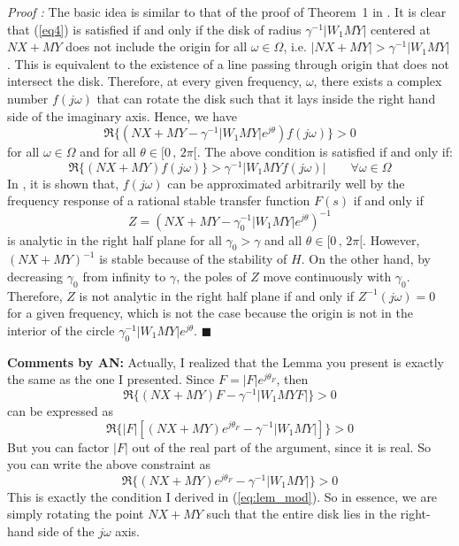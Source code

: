 \documentclass[12pt]{article}
\begin{document}
{\it Proof :} 
The basic idea is similar to that of  the proof of Theorem~1 in \cite{RM94}. It is clear that (\ref{eq4}) is satisfied if and only if the disk of radius $ \gamma ^{-1}|W_1MY|$ centered at $NX+MY$ does not include the origin for all $\omega \in \Omega$, i.e. $|NX+MY|>\gamma ^{-1}|W_1MY|$. This is equivalent to the existence of a line passing through origin that does not intersect the disk. Therefore, at every given frequency, $\omega$, there exists a complex number $f(j\omega)$ that can rotate the disk such that it lays inside the right hand side of the imaginary axis. Hence, we have 
\begin{equation}
\label{eq18}
\Re\{ (NX + MY - \gamma ^{-1}|W_1MY|e^{j\theta})f(j\omega)\}>0
\end{equation}
for all $\omega \in \Omega$ and for all $\theta \in [0 \, , \, 2 \pi [$. The above condition is satisfied if and only if:
\begin{equation}
\label{eq18}
\Re\{ (NX + MY)f(j\omega) \} > \gamma ^{-1}|W_1MYf(j\omega)| \qquad \forall \omega \in \Omega 
\end{equation}
In \cite{RM94}, it is shown that, $f(j\omega)$ can be approximated arbitrarily well by the frequency response of a rational stable transfer function $F(s)$ if and only if 
\begin{equation}
Z=(NX + MY - \gamma_0 ^{-1}|W_1MY|e^{j\theta})^{-1}
\end{equation}
is analytic in the right half plane for all $\gamma_0>\gamma$ and all $\theta \in [0 \, , \, 2 \pi [$. However, $(NX + MY )^{-1}$ is stable because of the stability of $H$. On the other hand, by decreasing $\gamma_0$ from infinity to $\gamma$, the poles of $Z$ move continuously with $\gamma_0$. Therefore, $Z$ is not analytic in the right half plane if and only if $Z^{-1}(j\omega)=0$ for a given frequency, which is not the case because the origin is not in the interior of the circle  $\gamma_0 ^{-1}|W_1MY|e^{j\theta}$.  
{\hfill \ensuremath{\blacksquare}}

{\bf Comments by AN:} 
Actually, I realized that the Lemma you present is exactly the same as the one I presented. Since $F = |F|e^{j\theta_F}$, then 
\begin{equation}
\Re\{(NX + MY)F - \gamma ^{-1}|W_1MYF| \}>0
\end{equation}
can be expressed as
\begin{equation}
\Re\{|F| \left[ (NX + MY)e^{j\theta_F} - \gamma ^{-1}|W_1MY| \right] \}>0
\end{equation}
But you can factor $|F|$ out of the real part of the argument, since it is real. So you can write the above constraint as
\begin{equation}
\Re\{ (NX + MY)e^{j\theta_F} - \gamma ^{-1}|W_1MY| \}>0
\end{equation}
This is exactly the condition I derived in (\ref{eq:lem_mod}). So in essence, we are simply rotating the point $NX+MY$ such that the entire disk lies in the right-hand side of the $j\omega$ axis.
\end{document}
